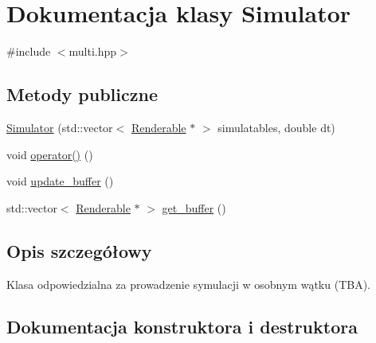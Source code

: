 \hypertarget{class_simulator}{}\section{Dokumentacja klasy Simulator}
\label{class_simulator}


{\ttfamily \#include $<$multi.\+hpp$>$}

\subsection*{Metody publiczne}
\begin{DoxyCompactItemize}
\item 
\hyperlink{class_simulator_a597385e2e9f501fbbd936e3b281cd2b1}{Simulator} (std\+::vector$<$ \hyperlink{class_renderable}{Renderable} $\ast$ $>$ simulatables, double dt)
\item 
void \hyperlink{class_simulator_ab844c2061cc955301bd63016e67ed2e0}{operator()} ()
\item 
void \hyperlink{class_simulator_a21d308aa878b8a23482a00d8939a9ada}{update\+\_\+buffer} ()
\item 
std\+::vector$<$ \hyperlink{class_renderable}{Renderable} $\ast$ $>$ \hyperlink{class_simulator_a276673b4c7124e93d037f8b0e857ea11}{get\+\_\+buffer} ()
\end{DoxyCompactItemize}


\subsection{Opis szczegółowy}
Klasa odpowiedzialna za prowadzenie symulacji w osobnym wątku (T\+BA). 

\subsection{Dokumentacja konstruktora i destruktora}
